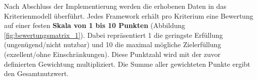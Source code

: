 Nach Abschluss der Implementierung werden die erhobenen Daten in das Kriterienmodell überführt. Jedes Framework erhält pro Kriterium eine Bewertung auf einer festen \textbf{Skala von 1 bis 10 Punkten} (Abbildung \ref{fig:bewertungsmatrix_1}). Dabei repräsentiert 1 die geringste Erfüllung (ungenügend/nicht nutzbar) und 10 die maximal mögliche Zielerfüllung (exzellent/ohne Einschränkungen). Diese Punktzahl wird mit der zuvor definierten Gewichtung multipliziert. Die Summe aller gewichteten Punkte ergibt den Gesamtnutzwert.